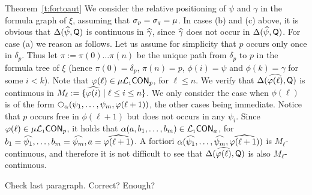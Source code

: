 \begin{proofof}{Theorem~\ref{t:fortoaut}}
		We consider the relative positioning of $\psi$ and $\gamma$ in the formula graph of $\xi$, assuming that $\sigma_p=\sigma_q=\mu$. In cases (b) and (c) above, it is obvious that $\Delta(\widehat{\psi}, \mathsf{Q})$ is continuous in $\widehat{\gamma}$, since $\widehat{\gamma}$ does not occur in $\Delta(\widehat{\psi},  \mathsf{Q})$. For case (a) we reason as follows. 
		Let us assume for simplicity that $p$ occurs only once in $\delta_p$. Thus let $\pi:= \pi(0)\dots \pi(n)$ be the unique path from $\delta_p$ to  $p$ in the formula tree of $\xi$ (hence $\pi(0)=\delta_p$,  $\pi(n)=p$, $\phi(i)=\psi$ and $\phi(k)=\gamma$ for some $i<k$). Note that $\varphi(\ell) \in \mu\mathcal{L}_{\scriptscriptstyle 1}\mathsf{CON}_{p}$, for $\ell \leq n$. We  verify that $\Delta(\widehat{\varphi(\ell)}, \mathsf{Q})$ is continuous in $M_\ell:=\{\widehat{ \varphi(i)} \mid \ell \leq i \leq n\}$. We only consider the case when $\phi(\ell)$ is of the form $\nxt{\al}(\psi_{1},\ldots,\psi_{m}, \phi(\ell+1))$, the other cases being immediate. Notice that $p$ occurs free in $\phi(\ell+1)$  but does not occurs in any $\psi_i$. Since $\varphi(\ell) \in \mu\mathcal{L}_{\scriptscriptstyle 1}\mathsf{CON}_{p}$, it holds that $\alpha(a, b_1, \dots, b_m)  \in 
\mathcal{L}_{\scriptscriptstyle 1}\mathsf{CON}_{a}$, for $b_1=\widehat{\psi_{1}},\ldots,b_m=\widehat{\psi_{m}}, a=\widehat{\varphi(\ell+1)}$. A fortiori $\alpha(\widehat{\psi_{1}},\ldots,\widehat{\psi_{m}}, \widehat{\varphi(\ell+1)}) $ is $M_\ell$-continuous, and therefore it is not difficult to see that  $\Delta(\widehat{\varphi(\ell)}, \mathsf{Q})$ is also $M_\ell$-continuous. 
		

\btbs
\item Check last paragraph. Correct? Enough?
\etbs
\end{proofof}
